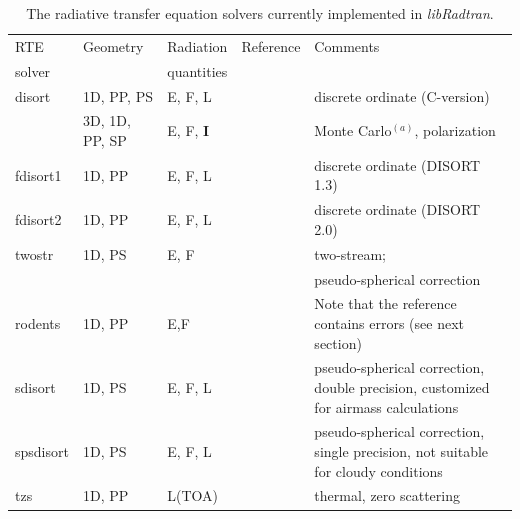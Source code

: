 \begin{table}[htbp]
  \caption[]
  {\label{tab:rte_solvers}The radiative transfer equation solvers
    currently implemented in {\em libRadtran}.}
  \smallskip
  \renewcommand{\arraystretch}{1.2}
  \begin{tabularx}{1.0\hsize}{lp{1.5cm}lp{4cm}X}
    \hline
    RTE        & Geometry & Radiation       & Reference            &
    Comments        \\ 
    solver     &          & quantities      &                      &
    \\ 
    \hline
    disort & 1D, PP, PS & E, F, L         & \citet{buras2011b}  &
    discrete ordinate (C-version)\\ 
    \ifmystic{MYSTIC     & 3D, 1D, PP, SP & E, F, \bf{I}&
      \citet{mayer2009, emde2007, emde2010, buras2011a, emde2011} & Monte Carlo$^{(a)}$, polarization}\\
    fdisort1 & 1D, PP & E, F, L         & \citet{Stamnes1988c}    &
    discrete ordinate (DISORT 1.3) \\ 
    fdisort2 & 1D, PP & E, F, L         & \citet{stamnes2000}  &
    discrete ordinate (DISORT 2.0) \\ 
    twostr     & 1D, PS & E, F            & \citet{Kylling1995}  & two-stream; \\ 
    &        &                 &                      &
    pseudo-spherical correction\\ 
    rodents    & 1D, PP & E,F             & \citet{Zdunkowski2007}     & Note that the reference contains errors (see next section) \\
    sdisort    & 1D, PS & E, F, L         & \citet{Dahlback1991}   &
    pseudo-spherical correction, \newline double
    precision, customized  \newline for airmass calculations\\
    spsdisort  & 1D, PS & E, F, L         & \citet{Dahlback1991}   &
    pseudo-spherical {correction}, \newline single
    precision, not suitable for cloudy conditions\\ 
    tzs        & 1D, PP & L(TOA)          &                      & thermal, zero scattering \\

\end{tabularx}
\end{table}
